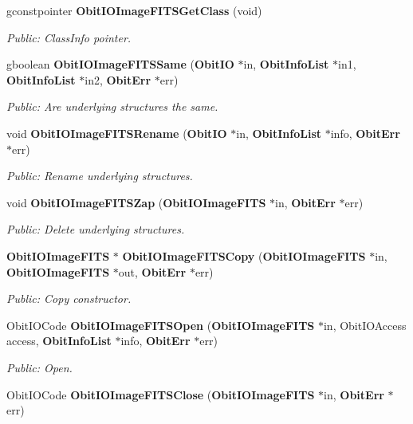 \begin{CompactItemize}
gconstpointer {\bf Obit\-IOImage\-FITSGet\-Class} (void)
\begin{CompactList}\small\item\em Public: Class\-Info pointer. \item\end{CompactList}\item 
gboolean {\bf Obit\-IOImage\-FITSSame} ({\bf Obit\-IO} $\ast$in, {\bf Obit\-Info\-List} $\ast$in1, {\bf Obit\-Info\-List} $\ast$in2, {\bf Obit\-Err} $\ast$err)
\begin{CompactList}\small\item\em Public: Are underlying structures the same. \item\end{CompactList}\item 
void {\bf Obit\-IOImage\-FITSRename} ({\bf Obit\-IO} $\ast$in, {\bf Obit\-Info\-List} $\ast$info, {\bf Obit\-Err} $\ast$err)
\begin{CompactList}\small\item\em Public: Rename underlying structures. \item\end{CompactList}\item 
void {\bf Obit\-IOImage\-FITSZap} ({\bf Obit\-IOImage\-FITS} $\ast$in, {\bf Obit\-Err} $\ast$err)
\begin{CompactList}\small\item\em Public: Delete underlying structures. \item\end{CompactList}\item 
{\bf Obit\-IOImage\-FITS} $\ast$ {\bf Obit\-IOImage\-FITSCopy} ({\bf Obit\-IOImage\-FITS} $\ast$in, {\bf Obit\-IOImage\-FITS} $\ast$out, {\bf Obit\-Err} $\ast$err)
\begin{CompactList}\small\item\em Public: Copy constructor. \item\end{CompactList}\item 
Obit\-IOCode {\bf Obit\-IOImage\-FITSOpen} ({\bf Obit\-IOImage\-FITS} $\ast$in, Obit\-IOAccess access, {\bf Obit\-Info\-List} $\ast$info, {\bf Obit\-Err} $\ast$err)
\begin{CompactList}\small\item\em Public: Open. \item\end{CompactList}\item 
Obit\-IOCode {\bf Obit\-IOImage\-FITSClose} ({\bf Obit\-IOImage\-FITS} $\ast$in, {\bf Obit\-Err} $\ast$err)

\end{CompactItemize}
